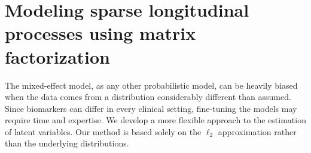 \documentclass[preprint]{imsart}
\numberwithin{equation}{section}
\theoremstyle{plain}
\begin{document}










\section{Modeling sparse longitudinal processes using matrix factorization}\label{s:context}


The mixed-effect model, as any other probabilistic model, can be heavily biased when the data comes from a distribution considerably different than assumed. Since biomarkers can differ in every clinical setting, fine-tuning the models may require time and expertise. We develop a more flexible approach to the estimation of latent variables. Our method is based solely on the $\ell_2$ approximation rather than the underlying distributions.
\end{document}
